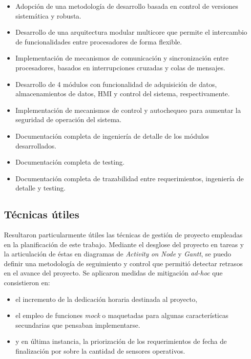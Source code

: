 \begin{itemize}
	\item Adopción de una metodología de desarrollo basada en control de versiones sistemática y robusta.
	\item Desarrollo de una arquitectura modular multicore que permite el intercambio de funcionalidades entre procesadores de forma flexible.
	\item Implementación de mecanismos de comunicación y sincronización entre procesadores, basados en interrupciones cruzadas y colas de mensajes.
	\item Desarrollo de 4 módulos con funcionalidad de adquisición de datos, almacenamientos de datos, HMI y control del sistema, respectivamente. 
	\item Implementación de mecanismos de control y autochequeo para aumentar la seguridad de operación del sistema.
	\item Documentación completa de ingeniería de detalle de los módulos desarrollados.
	\item Documentación completa de testing.
	\item Documentación completa de trazabilidad entre requerimientos, ingeniería de detalle y testing.
\end{itemize} 

\subsection{Técnicas útiles}
\label{subsec:tecnicas_utiles}

Resultaron particularmente útiles las técnicas de gestión de proyecto empleadas en la planificación de este trabajo.  Mediante el desglose del proyecto en tareas y la articulación de éstas en diagramas de \textit{Activity on Node} y \textit{Gantt}, se puedo definir una metodología de seguimiento y control que permitió detectar retrasos en el avance del proyecto. Se aplicaron medidas de mitigación \textit{ad-hoc} que consistieron en:

\begin{itemize}
	\item el incremento de la dedicación horaria destinada al proyecto,
	\item el empleo de funciones \textit{mock} o maquetadas para algunas características secundarias que pensaban implementarse.
	\item y en última instancia, la priorización de los requerimientos de fecha de finalización por sobre la cantidad de sensores operativos.
\end{itemize}  

